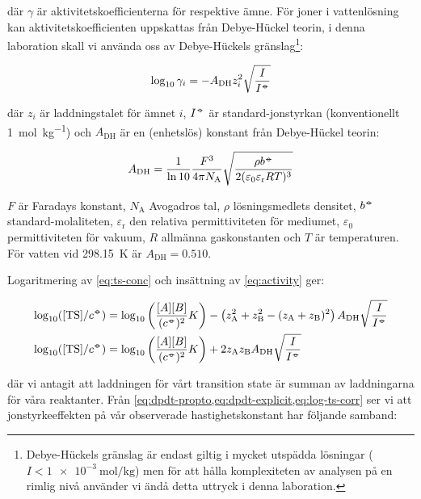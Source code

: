 där $\gamma$ är aktivitetskoefficienterna för respektive ämne. För joner
i vattenlösning kan aktivitetskoefficienten uppskattas från Debye-Hückel
teorin, i denna laboration skall vi använda oss av Debye-Hückels
gränslag\footnote{
  Debye-Hückels gränslag är endast giltig i mycket utspädda lösningar ($I
  < \SI{1e-3}{\mole\per\kg}$) men för att hålla komplexiteten av analysen
  på en rimlig nivå använder vi ändå detta uttryck i denna laboration.
}:

\begin{equation}
  \label{eq:activity}
  \log_{10}\gamma_i = -A_\mathrm{DH}z_i^2\sqrt{\frac{I}{I^{-\kern-5pt{\circ}\kern-5pt-}}}
\end{equation}

där $z_i$ är laddningstalet för ämnet $i$, $I^{-\kern-5pt{\circ}\kern-5pt-}$ är
standard-jonstyrkan (konventionellt \SI{1}{\mole\per\kg}) och $A_\mathrm{DH}$
är en (enhetslös) konstant från Debye-Hückel teorin:

\begin{equation}
  \label{eq:debye-huckel-a}
  A_\mathrm{DH} = \frac{1}{\ln 10} \frac{F^3}{4\mathrm{\pi} N_\mathrm{A}}\sqrt{\frac{\rho b^{-\kern-5pt{\circ}\kern-5pt-}}{2(\varepsilon_0\varepsilon_\mathrm{r}RT)^3}}
\end{equation}

$F$ är Faradays konstant, $N_\mathrm{A}$ Avogadros tal, $\rho$ lösningsmedlets
densitet, $b^{{-\kern-5pt{\circ}\kern-5pt-}}$ standard-molaliteten, $\varepsilon_\mathrm{r}$ den
relativa permittiviteten för mediumet, $\varepsilon_0$ permittiviteten för
vakuum, $R$ allmänna gaskonstanten och $T$ är temperaturen. För vatten vid
\SI{298.15}{\kelvin} är $A_\mathrm{DH} = 0.510$.

Logaritmering av \cref{eq:ts-conc} och insättning av \cref{eq:activity}
ger:

\begin{align}
  \log_{10}([\ce{TS}] / c^\plimsoll) &= \log_{10}\left(
    \frac{[A][B]}{(c^\plimsoll)^2}K \right) - \left(z_\mathrm{A}^2 + z_\mathrm{B}^2 - (z_\mathrm{A}+z_\mathrm{B})^2\right) A_\mathrm{DH}
    \sqrt{\frac{I}{I^\plimsoll}} \\
  \label{eq:log-ts-corr}
  \log_{10}([\ce{TS}] / c^\plimsoll) &= \log_{10}
    \left(\frac{[A][B]}{(c^\plimsoll)^2}K
    \right) + 2z_\mathrm{A}z_\mathrm{B}A_\mathrm{DH}\sqrt{\frac{I}{I^\plimsoll}}
\end{align}

där vi antagit att laddningen för vårt transition state är summan av
laddningarna för våra reaktanter.
Från \cref{eq:dpdt-propto,eq:dpdt-explicit,eq:log-ts-corr} ser vi att jonstyrkeeffekten
på vår observerade hastighetskonstant har följande samband:

